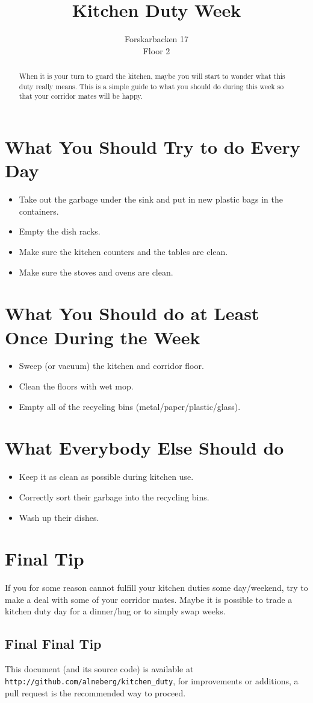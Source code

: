 \documentclass{article}
\title {Kitchen Duty Week}
\author{Forskarbacken 17 \\ Floor 2}
\date{}
\begin{document}
\maketitle
\thispagestyle{empty}
\begin{abstract}
  When it is your turn to guard the kitchen, maybe you will start to wonder what this duty really means. This is a simple guide to what you should do during this week so that your corridor mates will be happy.
\end{abstract}
\section*{What You Should Try to do Every Day}
\begin{itemize}
\item
  Take out the garbage under the sink and put in new plastic bags in the containers.
\item
  Empty the dish racks.
\item
  Make sure the kitchen counters and the tables are clean.
\item
  Make sure the stoves and ovens are clean.
\end{itemize}
\section*{What You Should do at Least Once During the Week}
\begin{itemize}
\item
  Sweep (or vacuum) the kitchen and corridor floor.
\item
  Clean the floors with wet mop.
\item
  Empty all of the recycling bins (metal/paper/plastic/glass).
\end{itemize}
  
\section*{What Everybody Else Should do}
\begin{itemize}
\item
  Keep it as clean as possible during kitchen use.
\item
  Correctly sort their garbage into the recycling bins.
\item
  Wash up their dishes.
\end{itemize}
\section*{Final Tip}
If you for some reason cannot fulfill your kitchen duties some day/weekend, try to make a deal with some of your corridor mates. Maybe it is possible to trade a kitchen duty day for a dinner/hug or to simply swap weeks.
\subsection*{Final Final Tip}
This document (and its source code) is available at \verb&http://github.com/alneberg/kitchen_duty&, for improvements or additions, a pull request is the recommended way to proceed.
\end{document}

